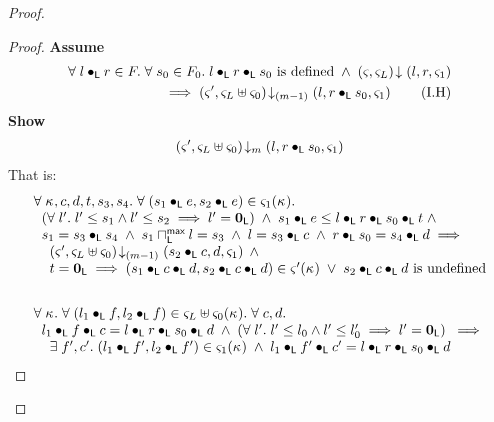 \begin{lemma}[]
\begin{proof}
\begin{proof}
\noindent\textbf{Assume}
\begin{align}
	\forall\; l \bullet_{\textsf{L}} r \in F.\;\forall\; s_0 \in F_0.\; l \bullet_{\textsf{L}} r \bullet_{\textsf{L}} s_0  \text{ is defined}  \;\land\; \left(\varsigma_{}, \varsigma_{L}\right) \!\downarrow \left(l, r, \varsigma_{1}\right) \nonumber \\
	\implies \left(\varsigma_{}', \varsigma_{L} \uplus \varsigma_{0}\right) \!\downarrow_{(m-1)} \left(l, r \bullet_{\textsf{L}} s_0, \varsigma_{1}\right)
	\tag{I.H} \label{LAW2:I.H}
\end{align}
\textbf{Show } 
%
\begin{align}
	\left(\varsigma_{}', \varsigma_{L} \uplus \varsigma_{0}\right) \!\downarrow_{m} \left(l, r \bullet_{\textsf{L}} s_0, \varsigma_{1}\right) \nonumber
\end{align}
%
That is:
%
\begin{align}
	&\begin{array}{l}
		\forall\; \kappa_{}, c, d, t, s_3, s_4.\;\forall\; (s_1 \bullet_{\textsf{L}} e, s_2 \bullet_{\textsf{L}} e) \in \varsigma_{1}(\kappa_{}).\; \\
	\hspace*{0.2cm}\left(\forall\; l'.\; l' \leq s_1 \land l' \leq s_2 \implies l' = \mathbf{0}_{\textsf{L}}\right) \;\land\; s_1 \bullet_{\textsf{L}} e \leq  l \bullet_{\textsf{L}} r \bullet_{\textsf{L}} s_0 \bullet_{\textsf{L}} t\;\land\\
	\hspace*{0.2cm} s_1 = s_3 \bullet_{\textsf{L}} s_4 \;\land\; s_1 \sqcap_{\textsf{L}}^{\textsf{max}} l = s_3 \;\land\; l = s_3 \bullet_{\textsf{L}} c \;\land\; r \bullet_{\textsf{L}} s_0 = s_4 \bullet_{\textsf{L}} d \implies\\
	\hspace*{0.4cm} \left(\varsigma_{}', \varsigma_{L} \uplus \varsigma_{0}\right) \!\downarrow_{(m-1)} \left(s_2 \bullet_{\textsf{L}} c, d, \varsigma_{1}\right) \;\land\\
	\hspace*{0.4cm} t = \mathbf{0}_{\textsf{L}} \implies (s_1 \bullet_{\textsf{L}} c \bullet_{\textsf{L}} d, s_2 \bullet_{\textsf{L}} c \bullet_{\textsf{L}} d) \in \varsigma_{}'(\kappa_{}) 
	\;\lor\; s_2 \bullet_{\textsf{L}} c \bullet_{\textsf{L}} d \text{ is undefined}
	\end{array} \label{LAW:Goal10} \\\nonumber\\
	&\begin{array}{l}
		\forall\; \kappa_{}.\; \forall\; (l_1 \bullet_{\textsf{L}} f, l_2 \bullet_{\textsf{L}} f) \in \varsigma_{L} \uplus \varsigma_{0}(\kappa_{}).\; \forall\; c, d.\; \\
		\hspace*{0.2cm} l_1 \bullet_{\textsf{L}} f \bullet_{\textsf{L}} c = l \bullet_{\textsf{L}} r \bullet_{\textsf{L}} s_0 \bullet_{\textsf{L}} d \;\land\; \left(\forall\; l'.\; l' \leq l_0 \land l' \leq l'_0 \implies l' = \mathbf{0}_{\textsf{L}}\right)  \;\implies\\
  \hspace*{0.4cm}\exists\; f', c'.\; (l_1 \bullet_{\textsf{L}} f', l_2 \bullet_{\textsf{L}} f') \in \varsigma_{1}(\kappa_{}) \;\land\; l_1 \bullet_{\textsf{L}} f' \bullet_{\textsf{L}} c' =  l \bullet_{\textsf{L}} r \bullet_{\textsf{L}} s_0 \bullet_{\textsf{L}} d\\

\end{array}
\end{align}
\end{proof}
\end{proof}
\end{lemma}
